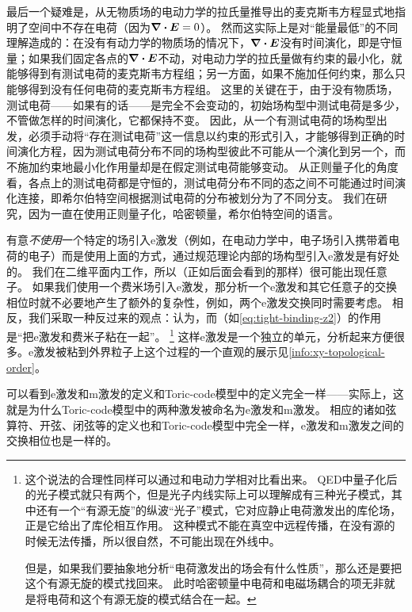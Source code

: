 最后一个疑难是，从无物质场的电动力学的拉氏量推导出的麦克斯韦方程显式地指明了空间中不存在电荷（因为$\div{\vb*{E}} = 0$）。
然而这实际上是对“能量最低”的不同理解造成的：在没有有动力学的物质场的情况下，$\div{\vb*{E}}$没有时间演化，即是守恒量；如果我们固定各点的$\div{\vb*{E}}$不动，对电动力学的拉氏量做有约束的最小化，就能够得到有测试电荷的麦克斯韦方程组；另一方面，如果不施加任何约束，那么只能够得到没有任何电荷的麦克斯韦方程组。
这里的关键在于，由于没有物质场，测试电荷——如果有的话——是完全不会变动的，初始场构型中测试电荷是多少，不管做怎样的时间演化，它都保持不变。
因此，从一个有测试电荷的场构型出发，必须手动将“存在测试电荷”这一信息以约束的形式引入，才能够得到正确的时间演化方程，因为测试电荷分布不同的场构型彼此不可能从一个演化到另一个，而不施加约束地最小化作用量却是在假定测试电荷能够变动。
从正则量子化的角度看，各点上的测试电荷都是守恒的，测试电荷分布不同的态之间不可能通过时间演化连接，即希尔伯特空间根据测试电荷的分布被划分为了不同分支。
我们在研究，因为一直在使用正则量子化，哈密顿量，希尔伯特空间的语言。

有意\emph{不使用}一个特定的场引入e激发（例如，在电动力学中，电子场引入携带着电荷的电子）而是使用上面的方式，通过规范理论内部的场构型引入e激发是有好处的。
我们在二维平面内工作，所以（正如后面会看到的那样）很可能出现任意子。
如果我们使用一个费米场引入e激发，那分析一个e激发和其它任意子的交换相位时就不必要地产生了额外的复杂性，例如，两个e激发交换同时需要考虑。
相反，我们采取一种反过来的观点：认为，而（如\eqref{eq:tight-binding-z2}）的作用是“把e激发和费米子粘在一起”。%
\footnote{
    这个说法的合理性同样可以通过和电动力学相对比看出来。
    QED中量子化后的光子模式就只有两个，但是光子内线实际上可以理解成有三种光子模式，其中还有一个“有源无旋”的纵波“光子”模式，它对应静止电荷激发出的库伦场，正是它给出了库伦相互作用。
    这种模式不能在真空中远程传播，在没有源的时候无法传播，所以很自然，不可能出现在外线中。

    但是，如果我们要抽象地分析“电荷激发出的场会有什么性质”，那么还是要把这个有源无旋的模式找回来。
    此时哈密顿量中电荷和电磁场耦合的项无非就是将电荷和这个有源无旋的模式结合在一起。
}%
这样e激发是一个独立的单元，分析起来方便很多。e激发被粘到外界粒子上这个过程的一个直观的展示见\autoref{info:xy-topological-order}。

可以看到e激发和m激发的定义和Toric-code模型中的定义完全一样——实际上，这就是为什么Toric-code模型中的两种激发被命名为e激发和m激发。
相应的诸如弦算符、开弦、闭弦等的定义也和Toric-code模型中完全一样，e激发和m激发之间的交换相位也是一样的。

